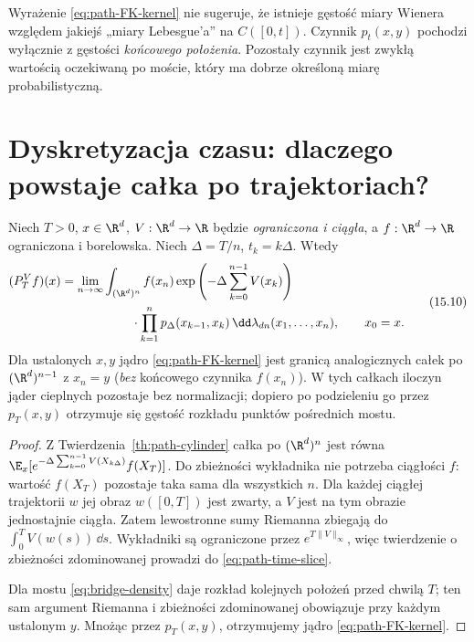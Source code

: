 \begin{uwaga}
Wyrażenie \eqref{eq:path-FK-kernel} nie sugeruje, że
istnieje gęstość miary Wienera względem jakiejś
„miary Lebesgue'a” na $C([0,t])$. Czynnik $p_t(x,y)$
pochodzi wyłącznie z gęstości \emph{końcowego położenia}.
Pozostały czynnik jest zwykłą wartością oczekiwaną po
moście, który ma dobrze określoną miarę probabilistyczną.
\end{uwaga}

\section{Dyskretyzacja czasu: dlaczego powstaje całka po trajektoriach?}

\begin{twierdzenie}
\label{th:path-time-slice}
Niech $T>0$, $x\in\R^d$, $V:\R^d\to\R$ będzie
\emph{ograniczona i ciągła}, a $f:\R^d\to\R$
ograniczona i borelowska. Niech $\Delta=T/n$,
$t_k=k\Delta$. Wtedy
\[
\begin{split}
 (P_T^Vf)(x)&=\lim_{n\to\infty}
 \int_{(\R^d)^n}f(x_n)
 \exp\left(-\Delta\sum_{k=0}^{n-1}V(x_k)\right)\\
 &\hspace{2cm}\cdot\prod_{k=1}^n p_\Delta(x_{k-1},x_k)
 \,\dd\lambda_{dn}(x_1,\ldots,x_n),\qquad x_0=x.
\end{split}
\tag{15.10}\label{eq:path-time-slice}
\]
Dla ustalonych $x,y$ jądro \eqref{eq:path-FK-kernel}
jest granicą analogicznych całek po
$(\R^d)^{n-1}$ z $x_n=y$ (\emph{bez} końcowego
czynnika $f(x_n)$). W tych całkach iloczyn jąder
cieplnych pozostaje bez normalizacji; dopiero po
podzieleniu go przez $p_T(x,y)$ otrzymuje się gęstość
rozkładu punktów pośrednich mostu.
\end{twierdzenie}
\begin{proof}
Z Twierdzenia~\ref{th:path-cylinder} całka po
$(\R^d)^n$ jest równa
$\E_x[e^{-\Delta\sum_{k=0}^{n-1}V(X_{k\Delta})}f(X_T)]$.
Do zbieżności wykładnika nie potrzeba ciągłości $f$:
wartość $f(X_T)$ pozostaje taka sama dla wszystkich $n$.
Dla każdej ciągłej trajektorii $w$ jej obraz $w([0,T])$
jest zwarty, a $V$ jest na tym obrazie jednostajnie ciągła.
Zatem lewostronne sumy Riemanna zbiegają do
$\int_0^TV(w(s))\,\dd s$. Wykładniki są ograniczone
przez $e^{T\|V\|_\infty}$, więc twierdzenie o zbieżności
zdominowanej prowadzi do \eqref{eq:path-time-slice}.

Dla mostu \eqref{eq:bridge-density} daje rozkład
kolejnych położeń przed chwilą $T$; ten sam argument
Riemanna i zbieżności zdominowanej obowiązuje przy
każdym ustalonym $y$. Mnożąc przez $p_T(x,y)$,
otrzymujemy jądro \eqref{eq:path-FK-kernel}.
\end{proof}

